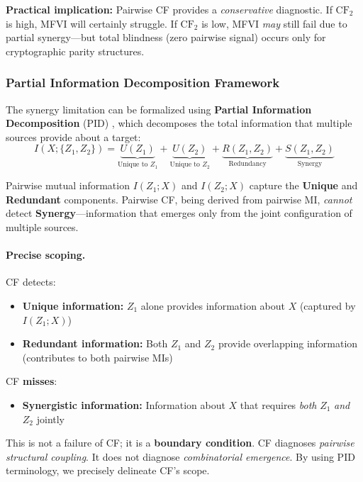 \documentclass[10pt]{article} %
\theoremstyle{plain}
\theoremstyle{definition}
\begin{document}
\noindent \textbf{Practical implication:} Pairwise CF provides a \emph{conservative} diagnostic. If $\text{CF}_2$ is high, MFVI will certainly struggle. If $\text{CF}_2$ is low, MFVI \emph{may} still fail due to partial synergy---but total blindness (zero pairwise signal) occurs only for cryptographic parity structures.

\subsubsection{Partial Information Decomposition Framework}

The synergy limitation can be formalized using \textbf{Partial Information Decomposition} (PID) \citep{williams2010nonnegative}, which decomposes the total information that multiple sources provide about a target:
\begin{equation}
I(X; \{Z_1, Z_2\}) = \underbrace{U(Z_1)}_{\text{Unique to } Z_1} + \underbrace{U(Z_2)}_{\text{Unique to } Z_2} + \underbrace{R(Z_1, Z_2)}_{\text{Redundancy}} + \underbrace{S(Z_1, Z_2)}_{\text{Synergy}}
\end{equation}

Pairwise mutual information $I(Z_1; X)$ and $I(Z_2; X)$ capture the \textbf{Unique} and \textbf{Redundant} components. Pairwise CF, being derived from pairwise MI, \emph{cannot} detect \textbf{Synergy}---information that emerges only from the joint configuration of multiple sources.

\paragraph{Precise scoping.} CF detects:
\begin{itemize}
    \item \textbf{Unique information:} $Z_1$ alone provides information about $X$ (captured by $I(Z_1; X)$)
    \item \textbf{Redundant information:} Both $Z_1$ and $Z_2$ provide overlapping information (contributes to both pairwise MIs)
\end{itemize}

\noindent CF \textbf{misses}:
\begin{itemize}
    \item \textbf{Synergistic information:} Information about $X$ that requires \emph{both} $Z_1$ \emph{and} $Z_2$ jointly
\end{itemize}

This is not a failure of CF; it is a \textbf{boundary condition}. CF diagnoses \emph{pairwise structural coupling}. It does not diagnose \emph{combinatorial emergence}. By using PID terminology, we precisely delineate CF's scope.
\end{document}
